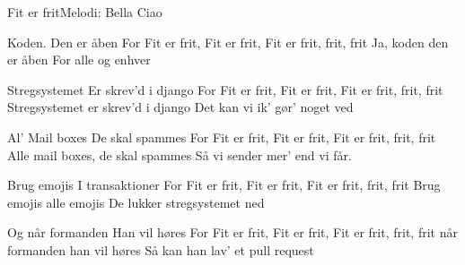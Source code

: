 \begin{sang}{Fit er frit}{Melodi: Bella Ciao}
\begin{vers}
Koden.
Den er åben
For Fit er frit, Fit er frit, Fit er frit, frit, frit
Ja, koden den er åben
For alle og enhver 
\end{vers}
\begin{vers}
Stregsystemet
Er skrev’d i django
For Fit er frit, Fit er frit, Fit er frit, frit, frit
Stregsystemet er skrev’d i django
Det kan vi ik’ gør’ noget ved 
\end{vers}
\begin{vers}
Al’ Mail boxes
De skal spammes
For Fit er frit, Fit er frit, Fit er frit, frit, frit
Alle mail boxes, de skal spammes
Så vi sender mer’ end vi får.
\end{vers}
\begin{vers}
Brug emojis
I transaktioner
For Fit er frit, Fit er frit, Fit er frit, frit, frit
Brug emojis alle emojis
De lukker stregsystemet ned 
\end{vers}
\begin{vers}
Og når formanden
Han vil høres
For Fit er frit, Fit er frit, Fit er frit, frit, frit
når formanden han vil høres
Så kan han lav’ et pull request 
\end{vers}
\end{sang}
